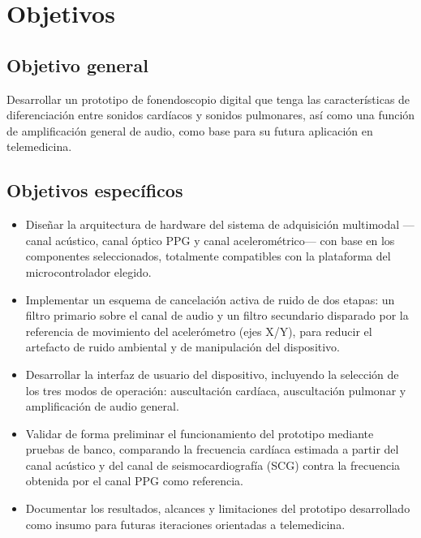 \chapter{Objetivos}\label{Objetivos}

\section{Objetivo general}

Desarrollar un prototipo de fonendoscopio digital que tenga las características de diferenciación entre sonidos cardíacos y sonidos pulmonares, así como una función de amplificación general de audio, como base para su futura aplicación en telemedicina.

\section{Objetivos específicos}

\begin{itemize}
    \item Diseñar la arquitectura de hardware del sistema de adquisición multimodal ---canal acústico, canal óptico PPG y canal acelerométrico--- con base en los componentes seleccionados, totalmente compatibles con la plataforma del microcontrolador elegido.

    \item Implementar un esquema de cancelación activa de ruido de dos etapas: un filtro primario sobre el canal de audio y un filtro secundario disparado por la referencia de movimiento del acelerómetro (ejes X/Y), para reducir el artefacto de ruido ambiental y de manipulación del dispositivo.

    \item Desarrollar la interfaz de usuario del dispositivo, incluyendo la selección de los tres modos de operación: auscultación cardíaca, auscultación pulmonar y amplificación de audio general.

    \item Validar de forma preliminar el funcionamiento del prototipo mediante pruebas de banco, comparando la frecuencia cardíaca estimada a partir del canal acústico y del canal de seismocardiografía (SCG) contra la frecuencia obtenida por el canal PPG como referencia.

    \item Documentar los resultados, alcances y limitaciones del prototipo desarrollado como insumo para futuras iteraciones orientadas a telemedicina.
\end{itemize}

